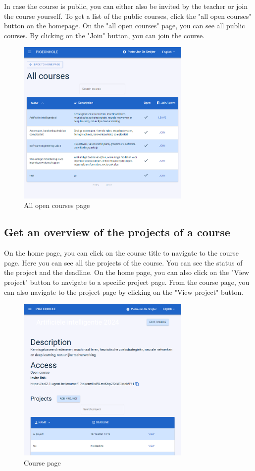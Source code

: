 \documentclass{article}
\begin{document}
In case the course is public, you can either also be invited by the teacher or join the course yourself. 
To get a list of the public courses, click the "all open courses" button on the homepage.
On the "all open courses" page, you can see all public courses. By clicking on the "Join" button, you can join the course.

\begin{figure}[H]
    \centering
    \includegraphics[width=0.75\textwidth]{images/allcourses.png}
    \caption{All open courses page}
\end{figure}

\subsection{Get an overview of the projects of a course}
On the home page, you can click on the course title to navigate to the course page. Here you can see all the projects of the course. You can see the status of the project and the deadline.
On the home page, you can also click on the "View project" button to navigate to a specific project page.
From the course page, you can also navigate to the project page by clicking on the "View project" button.


\begin{figure}[H]
    \centering
    \includegraphics[width=0.75\textwidth]{images/course_page.png}
    \caption{Course page}
\end{figure}
\end{document}
